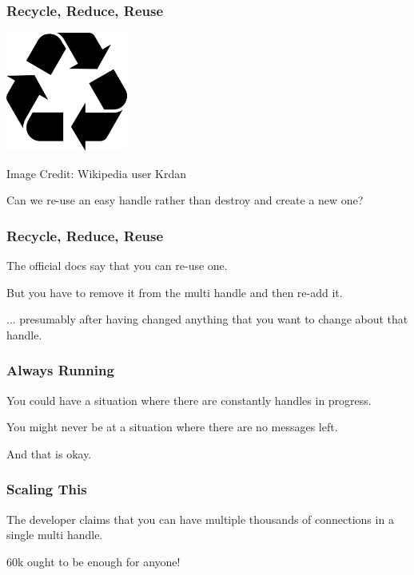 \begin{frame}
	\frametitle{Recycle, Reduce, Reuse}

	\begin{center}
		\includegraphics[width=0.3\textwidth]{images/recycle.png}
	\end{center}
	\hfill Image Credit: Wikipedia user Krdan

	Can we re-use an easy handle rather than destroy and create a new one?

\end{frame}

\begin{frame}
	\frametitle{Recycle, Reduce, Reuse}

	The official docs say that you can re-use one.

	But you have to remove it from the multi handle and then re-add it.

	... presumably after having changed anything that you want to change about that handle.

\end{frame}


\begin{frame}
	\frametitle{Always Running}

	You could have a situation where there are constantly handles in progress.

	You might never be at a situation where there are no messages left.

	And that is okay.

\end{frame}

\begin{frame}
	\frametitle{Scaling This}

	The developer claims that you can have multiple thousands of connections in a single multi handle.

	60k ought to be enough for anyone!
\end{frame}


